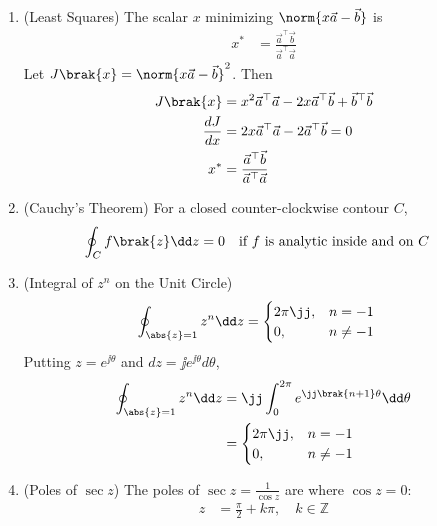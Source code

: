 \begin{enumerate}[label=\thesubsection.\arabic*, ref=\thesubsection.\theenumi, itemsep=0pt, leftmargin=0pt, labelwidth=0pt, itemindent=0pt, labelsep=1em, align=right]
\item (Least Squares) The scalar $x$ minimizing $\norm{x\vec{a} - \vec{b}}$ is
\begin{align}
x^* &= \frac{\vec{a}^\top \vec{b}}{\vec{a}^\top \vec{a}}
\label{eq:F-ls}
\end{align}
\solution Let $J\brak{x} = \norm{x\vec{a} - \vec{b}}^2$. Then
\begin{align}
J\brak{x} &= x^2 \vec{a}^\top \vec{a} - 2x \vec{a}^\top \vec{b} + \vec{b}^\top \vec{b}
\\
\frac{dJ}{dx} &= 2x \vec{a}^\top \vec{a} - 2\vec{a}^\top \vec{b} = 0
\\
x^* &= \frac{\vec{a}^\top \vec{b}}{\vec{a}^\top \vec{a}}
\end{align}

\item (Cauchy's Theorem) For a closed counter-clockwise contour $C$,
\begin{align}
\oint_{C} f\brak{z} \dd z &= 0 \quad \text{if } f \text{ is analytic inside and on } C
\label{eq:F-cauchy}
\end{align}

\item (Integral of $z^n$ on the Unit Circle)
\begin{align}
\oint_{\abs{z} = 1} z^n \dd z &= \begin{cases} 2\pi \jj, & n = -1 \\ 0, & n \ne -1 \end{cases}
\label{eq:F-zn}
\end{align}
\solution Putting $z = e^{\jj \theta}$ and $dz = \jj e^{\jj \theta} d\theta$,
\begin{align}
\oint_{\abs{z} = 1} z^n \dd z &= \jj \int_{0}^{2\pi} e^{\jj \brak{n + 1}\theta} \dd \theta
\\
&= \begin{cases} 2\pi \jj, & n = -1 \\ 0, & n \ne -1 \end{cases}
\end{align}

\item (Poles of $\sec z$) The poles of $\sec z = \frac{1}{\cos z}$ are where $\cos z = 0$:
\begin{align}
z &= \frac{\pi}{2} + k\pi, \quad k \in \mathbb{Z}
\label{eq:F-sec}
\end{align}

\end{enumerate}
